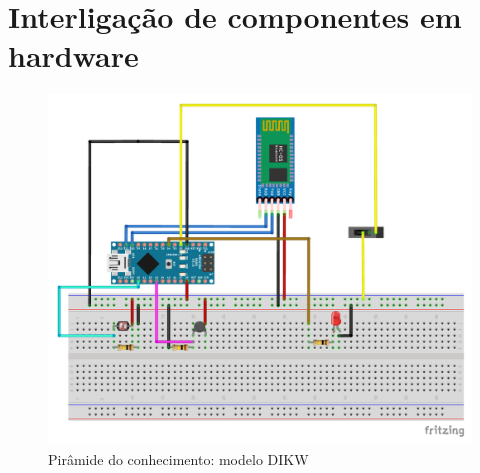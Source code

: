 \chapter{Interligação de componentes em hardware}


\begin{figure}[h]
	\centering
	\includegraphics[width=\linewidth]{esquemas/arduino-fritzing/esquema-arduino_bb.pdf}
	\caption{Pirâmide do conhecimento: modelo DIKW}
	\label{dikw}
\end{figure}